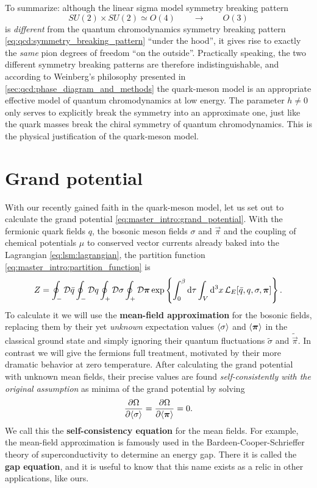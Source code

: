 To summarize: although the linear sigma model symmetry breaking pattern
\begin{equation}
	SU(2) \times SU(2) \simeq O(4) \qquad \longrightarrow \qquad O(3)
\end{equation}
is \emph{different} from the quantum chromodynamics symmetry breaking pattern \eqref{eq:qcd:symmetry_breaking_pattern} ``under the hood'',
it gives rise to exactly the \emph{same} pion degrees of freedom ``on the outside''.
Practically speaking, the two different symmetry breaking patterns are therefore indistinguishable,
and according to Weinberg's philosophy presented in \cref{sec:qcd:phase_diagram_and_methods}
the quark-meson model is an appropriate effective model of quantum chromodynamics at low energy.
The parameter $h \neq 0$ only serves to explicitly break the symmetry into an approximate one,
just like the quark masses break the chiral symmetry of quantum chromodynamics.
This is the physical justification of the quark-meson model.

\section{Grand potential}
\label{sec:lsm:grand_potential}

With our recently gained faith in the quark-meson model,
let us set out to calculate the grand potential \eqref{eq:master_intro:grand_potential}.
With the fermionic quark fields $q$, the bosonic meson fields $\sigma$ and $\vec\pi$
and the coupling of chemical potentials $\mu$ to conserved vector currents already baked into the Lagrangian \eqref{eq:lsm:lagrangian},
the partition function \eqref{eq:master_intro:partition_function} is
\begin{equation}
	Z = \oint_- \mathcal{D} \bar{q} \oint_- \mathcal{D} q \oint_+ \mathcal{D} \sigma \oint_+ \mathcal{D} {\bm{\pi}} \exp \left\{ \int_0^\beta \mathop{}\!\mathrm{d} \tau \int_V \mathop{}\!\mathrm{d}^3 x \, \mathcal{L}_E[\bar{q}, q, \sigma, {\bm{\pi}}]  \right\} .
\end{equation}
To calculate it we will use the \textbf{mean-field approximation} for the bosonic fields,
replacing them by their yet \emph{unknown} expectation values $\langle \sigma \rangle$ and $\langle {\bm{\pi}} \rangle$ in the classical ground state
and simply ignoring their quantum fluctuations $\tilde{\sigma}$ and $\tilde{\vec\pi}$.
In contrast we will give the fermions full treatment,
motivated by their more dramatic behavior at zero temperature.
After calculating the grand potential with unknown mean fields,
their precise values are found \emph{self-consistently with the original assumption} as minima of the grand potential by solving
\begin{equation}
	\pdv{\Omega}{ \langle \sigma \rangle} = \pdv{\Omega}{ \langle {\bm{\pi}} \rangle} = 0.
\label{eq:lsm:gap_equation}
\end{equation}
We call this the \textbf{self-consistency equation} for the mean fields.
For example, the mean-field approximation is famously used in the Bardeen-Cooper-Schrieffer theory of superconductivity to determine an energy gap.
There it is called the \textbf{gap equation}, and it is useful to know that this name exists as a relic in other applications, like ours.


